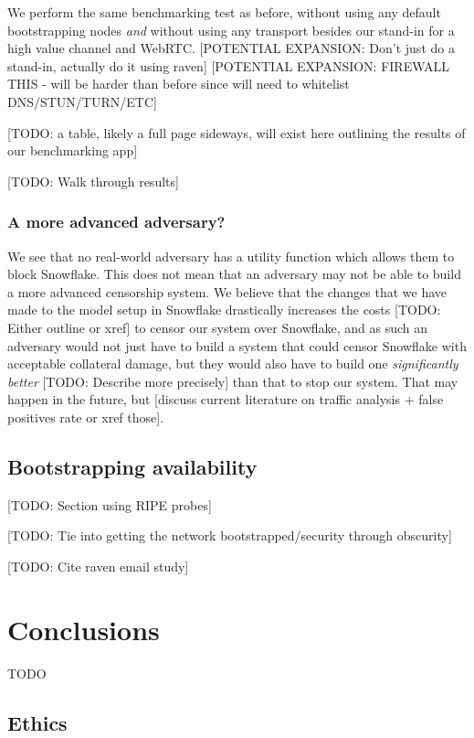 \documentclass[12pt]{report}
\begin{document}
We perform the same benchmarking test as before, without using any default bootstrapping nodes \emph{and} without using any transport besides our stand-in for a high value channel and WebRTC. [POTENTIAL EXPANSION: Don't just do a stand-in, actually do it using raven] [POTENTIAL EXPANSION: FIREWALL THIS - will be harder than before since will need to whitelist DNS/STUN/TURN/ETC]

[TODO: a table, likely a full page sideways, will exist here outlining the results of our benchmarking app]

[TODO: Walk through results]

\subsection{A more advanced adversary?}

We see that no real-world adversary has a utility function which allows them to block Snowflake. This does not mean that an adversary may not be able to build a more advanced censorship system. We believe that the changes that we have made to the model setup in Snowflake drastically increases the costs [TODO: Either outline or xref] to censor our system over Snowflake, and as such an adversary would not just have to build a system that could censor Snowflake with acceptable collateral damage, but they would also have to build one \emph{significantly better} [TODO: Describe more precisely] than that to stop our system. That may happen in the future, but [discuss current literature on traffic analysis + false positives rate or xref those].

\section{Bootstrapping availability}

[TODO: Section using RIPE probes]

[TODO: Tie into getting the network bootstrapped/security through obscurity]

[TODO: Cite raven email study]

\chapter{Conclusions}

TODO

\section{Ethics}
\end{document}
